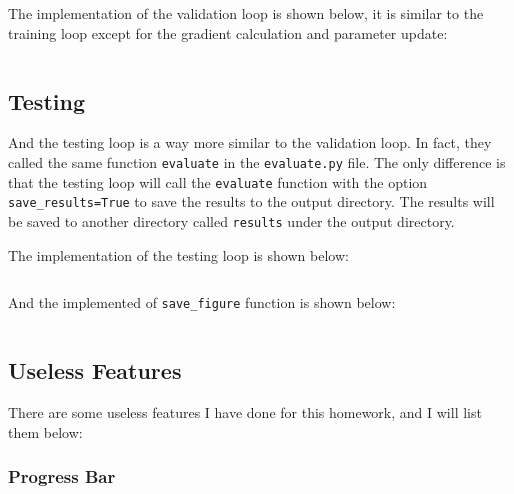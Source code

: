 The implementation of the validation loop is shown below, it is similar to the training loop except for the gradient calculation and parameter update:

\inputminted[firstline=7]{python}{../src/evaluate.py}

\subsection{Testing}

And the testing loop is a way more similar to the validation loop.
In fact, they called the same function \texttt{evaluate} in the \texttt{evaluate.py} file.
The only difference is that the testing loop will call the \texttt{evaluate} function with the option \texttt{save\_results=True} to save the results to the output directory.
The results will be saved to another directory called \texttt{results} under the output directory.


The implementation of the testing loop is shown below:

\inputminted[firstline=17, lastline=43, highlightlines=41]{python}{../src/inference.py}

And the implemented of \texttt{save\_figure} function is shown below:

\inputminted[firstline=23, lastline=35]{python}{../src/utils.py}

\subsection{Useless Features}

There are some useless features I have done for this homework, and I will list them below:

\subsubsection{Progress Bar}

